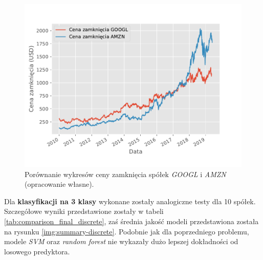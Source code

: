 \documentclass[a4paper, twoside, 11pt, openright]{article}
\begin{document}
\begin{figure}[H]
\centering \includegraphics[scale=1]{img/AMZN_GOOGL_close_comparison.pdf}
\caption{Porównanie wykresów ceny zamknięcia spółek \textit{GOOGL} i \textit{AMZN} (opracowanie własne).}
\label{img:amzn_googl_adjusted_comparison}
\end{figure}

\bigskip

Dla \textbf{klasyfikacji na 3 klasy} wykonane zostały analogiczne testy dla 10 spółek. Szczegółowe wyniki przedstawione zostały w tabeli \ref{tab:comparison_final_discrete}, zaś średnia jakość modeli  przedstawiona została na rysunku \ref{img:summary-discrete}. Podobnie jak dla poprzedniego problemu, modele \textit{SVM} oraz \textit{random forest} nie wykazały dużo lepszej dokładności od losowego predyktora. 
\end{document}
